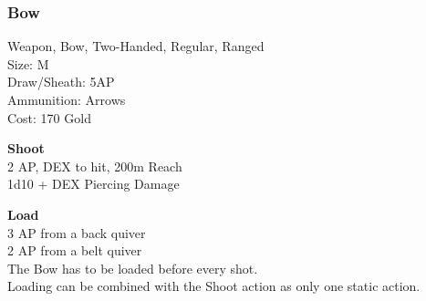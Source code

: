 \subsubsection{Bow}\label{weapon:bow}
Weapon, Bow, Two-Handed, Regular, Ranged\\
Size: M\\
Draw/Sheath: 5AP\\
Ammunition: Arrows\\
Cost: 170 Gold

\textbf{Shoot}\\
2 AP, DEX to hit, 200m Reach\\
1d10 + \texttimes DEX Piercing Damage

\textbf{Load}\\
3 AP from a back quiver\\
2 AP from a belt quiver\\
The Bow has to be loaded before every shot.\\
Loading can be combined with the Shoot action as only one static action.